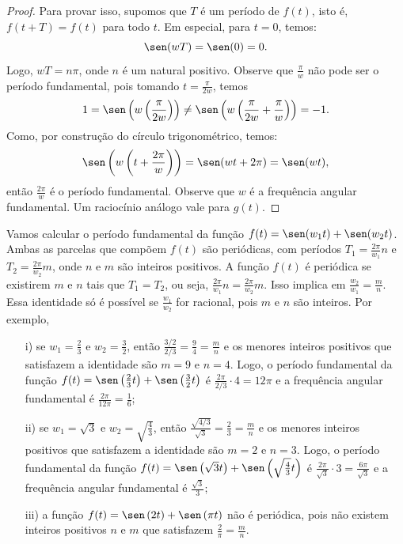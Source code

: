 \begin{proof} Para provar isso, supomos que $T$ é um período de $f(t)$, isto é, $f(t+T)=f(t)$ para todo $t$. Em especial, para $t=0$, temos:
\begin{equation}
\sen(wT)=\sen(0)=0.
\end{equation}
Logo, $wT=n\pi$, onde $n$ é um natural positivo. Observe que $\frac{\pi}{w}$ não pode ser o período fundamental, pois tomando $t=\frac{\pi}{2w}$, temos
\begin{equation}1=\sen\left(w\left(\frac{\pi}{2w}\right)\right)\neq \sen\left(w\left(\frac{\pi}{2w}+\frac{\pi}{w}\right)\right)=-1.\end{equation}
Como, por construção do círculo trigonométrico, temos:
\begin{equation}
\sen\left(w\left(t+\frac{2\pi}{w}\right)\right)=\sen(wt+2\pi)=\sen(wt),
\end{equation}
então $\frac{2\pi}{w}$ é o período fundamental. Observe que $w$ é a frequência angular fundamental. Um raciocínio análogo vale para $g(t)$.
\end{proof}
\begin{ex} Vamos calcular o período fundamental da função $f(t)=\sen(w_1t)+\sen(w_2t)$. Ambas as parcelas que compõem $f(t)$ são periódicas, com períodos $T_1=\frac{2\pi}{w_1}n$ e $T_2=\frac{2\pi}{w_2}m$, onde $n$ e $m$ são inteiros positivos. A função $f(t)$ é periódica se existirem $m$ e $n$ tais que $T_1=T_2$, ou seja, $\frac{2\pi}{w_1}n=\frac{2\pi}{w_2}m$. Isso implica em $\frac{w_2}{w_1}=\frac{m}{n}$. Essa identidade só é possível se $\frac{w_1}{w_2}$ for racional, pois $m$ e $n$ são inteiros. Por exemplo,
\begin{itemize}
 \item[i)] se $w_1=\frac{2}{3}$ e $w_2=\frac{3}{2}$, então $\frac{3/2}{2/3}=\frac{9}{4}=\frac{m}{n}$ e os menores inteiros positivos que satisfazem a identidade são $m=9$ e $n=4$. Logo, o período fundamental da função $f(t)=\sen\left(\frac{2}{3}t\right)+\sen\left(\frac{3}{2}t\right)$ é $\frac{2\pi}{2/3}\cdot 4= 12\pi$ e a frequência angular fundamental é $\frac{2\pi}{12\pi}=\frac{1}{6}$;
 \item[ii)] se $w_1=\sqrt{3}$ e $w_2=\sqrt{\frac{4}{3}}$, então $\frac{\sqrt{4/3}}{\sqrt{3}}=\frac{2}{3}=\frac{m}{n}$ e os menores inteiros positivos que satisfazem a identidade são $m=2$ e $n=3$. Logo, o período fundamental da função $f(t)=\sen\left(\sqrt{3}t\right)+\sen\left(\sqrt{\frac{4}{3}}t\right)$ é $\frac{2\pi}{\sqrt{3}}\cdot 3= \frac{6\pi}{\sqrt{3}}$ e a frequência angular fundamental é $\frac{\sqrt{3}}{3}$;
 \item[iii)] a função $f(t)=\sen\left(2t\right)+\sen\left(\pi t\right)$ não é periódica, pois não existem inteiros positivos $n$ e $m$ que satisfazem $\frac{2}{\pi}=\frac{m}{n}$.
 \end{itemize}
\end{ex}
